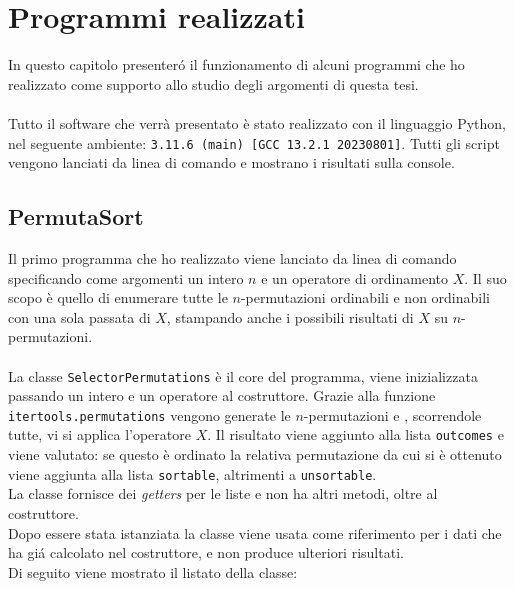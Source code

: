 \chapter{Programmi realizzati}
In questo capitolo presenter\'o il funzionamento di alcuni programmi che ho realizzato come supporto allo studio degli argomenti di questa tesi.\\\\
Tutto il software che verr\`a presentato \`e stato realizzato con il linguaggio Python, nel seguente ambiente: \texttt{3.11.6 (main) [GCC 13.2.1 20230801]}. Tutti gli script vengono lanciati da linea di comando e mostrano i risultati sulla console.
\section*{PermutaSort}
Il primo programma che ho realizzato viene lanciato da linea di comando specificando come argomenti un intero $n$ e un operatore di ordinamento $X$. Il suo scopo \`e quello di enumerare tutte le $n$-permutazioni ordinabili e non ordinabili con una sola passata di $X$, stampando anche i possibili risultati di $X$ su $n$-permutazioni.\\\\
La classe \texttt{SelectorPermutations} \`e il core del programma, viene inizializzata passando un intero e un operatore al costruttore. Grazie alla funzione \texttt{itertools.permutations} vengono generate le $n$-permutazioni e , scorrendole tutte, vi si applica l'operatore $X$. Il risultato viene aggiunto alla lista \texttt{outcomes} e viene valutato: se questo \`e ordinato la relativa permutazione da cui si \`e ottenuto viene aggiunta alla lista \texttt{sortable}, altrimenti a \texttt{unsortable}.\\La classe fornisce dei \textit{getters} per le liste e non ha altri metodi, oltre al costruttore.\\
Dopo essere stata istanziata la classe viene usata come riferimento per i dati che ha gi\'a calcolato nel costruttore, e non produce ulteriori risultati.\\Di seguito viene mostrato il listato della classe:
\\
